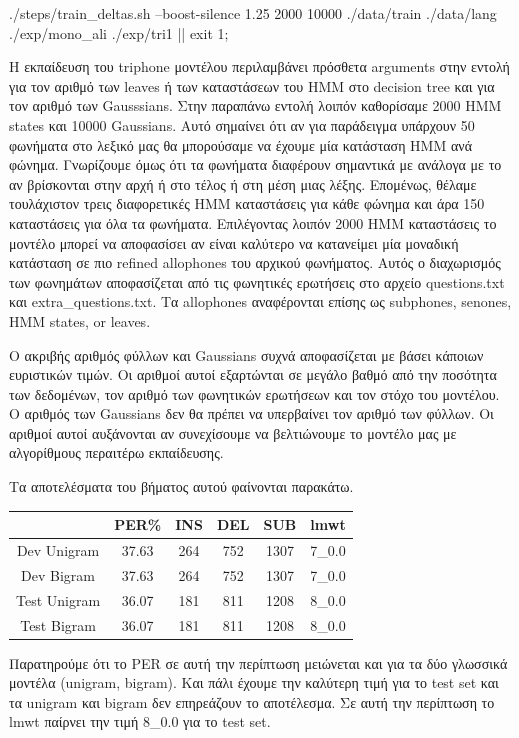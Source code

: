 \documentclass[12pt]{article}
\begin{document}
./steps/train\_deltas.sh --boost-silence 1.25 2000 10000 ./data/train ./data/lang ./exp/mono\_ali ./exp/tri1 || exit 1;

Η εκπαίδευση του triphone μοντέλου περιλαμβάνει πρόσθετα arguments στην εντολή για τον αριθμό των leaves ή των καταστάσεων του HMM στο decision tree και για τον αριθμό των Gausssians. Στην παραπάνω εντολή λοιπόν καθορίσαμε 2000 HMM states και 10000 Gaussians. Αυτό σημαίνει ότι αν για παράδειγμα υπάρχουν 50 φωνήματα στο λεξικό μας θα μπορούσαμε να έχουμε μία κατάσταση HMM ανά φώνημα. Γνωρίζουμε όμως ότι τα φωνήματα διαφέρουν σημαντικά με ανάλογα με το αν βρίσκονται στην αρχή ή στο τέλος ή στη μέση μιας λέξης. Επομένως, θέλαμε τουλάχιστον τρεις διαφορετικές HMM καταστάσεις για κάθε φώνημα και άρα 150 καταστάσεις για όλα τα φωνήματα. Επιλέγοντας λοιπόν 2000 HMM καταστάσεις το μοντέλο μπορεί να αποφασίσει αν είναι καλύτερο να κατανείμει μία μοναδική κατάσταση σε πιο refined allophones του αρχικού φωνήματος. Αυτός ο διαχωρισμός των φωνημάτων αποφασίζεται από τις φωνητικές ερωτήσεις στο αρχείο questions.txt και extra\_questions.txt. Τα allophones αναφέρονται επίσης ως subphones, senones, HMM states, or leaves.

Ο ακριβής αριθμός φύλλων και Gaussians συχνά αποφασίζεται με βάσει κάποιων ευριστικών τιμών. Οι αριθμοί αυτοί εξαρτώνται σε μεγάλο βαθμό από την ποσότητα των δεδομένων, τον αριθμό των φωνητικών ερωτήσεων και τον στόχο του μοντέλου. Ο αριθμός των Gaussians δεν θα πρέπει να υπερβαίνει τον αριθμό των φύλλων. Οι αριθμοί αυτοί αυξάνονται αν συνεχίσουμε να βελτιώνουμε το μοντέλο μας με αλγορίθμους περαιτέρω εκπαίδευσης.

Τα αποτελέσματα του βήματος αυτού φαίνονται παρακάτω.

\begin{center}
\begin{tabular}{ |c|c|c|c|c|c| } 
 \hline
    &PER\% & INS & DEL & SUB & lmwt\\
 \hline 
 Dev Unigram & 37.63 & 264 & 752 & 1307 & 7\_0.0\\
\hline 
 Dev Bigram & 37.63 & 264 & 752 & 1307 & 7\_0.0\\
\hline 
 Test Unigram & 36.07 & 181 & 811 & 1208 & 8\_0.0\\
\hline 
 Test Bigram & 36.07 & 181 & 811 & 1208 & 8\_0.0\\
\hline 
\end{tabular}
\end{center}

Παρατηρούμε ότι το PER σε αυτή την περίπτωση μειώνεται και για τα δύο γλωσσικά μοντέλα (unigram, bigram). Και πάλι έχουμε την καλύτερη τιμή για το test set και τα unigram και bigram δεν επηρεάζουν το αποτέλεσμα. Σε αυτή την περίπτωση το lmwt παίρνει την τιμή 8\_0.0 για το test set.
\end{document}
